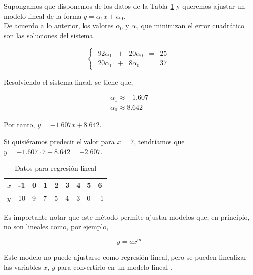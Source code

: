 \begin{ejemplo}
	Supongamos que disponemos de los datos de la Tabla~\ref{tbl:regresion_lineal} y queremos ajustar un modelo lineal de la forma $y = \alpha_1 x + \alpha_0$.\\
	
	De acuerdo a lo anterior, los valores $\alpha_0$ y $\alpha_1$ que minimizan el error cuadrático son las soluciones del sistema
	
	\begin{equation*}
	\begin{cases}
	\begin{array}{ccccc}
	92 \alpha_1 & + & 20 \alpha_0 & = & 25 \\
	20 \alpha_1 & + &  8 \alpha_0 & = & 37
	\end{array}
	\end{cases}
	\end{equation*}
	
	Resolviendo el sistema lineal, se tiene que,
	
	\begin{eqnarray*}
	\alpha_1 \approx -1.607 \\
	\alpha_0 \approx  8.642
	\end{eqnarray*}
	
	Por tanto, $y = -1.607x + 8.642$.
	
	Si quisiéramos predecir el valor para $x=7$, tendríamos que $y = -1.607\cdot 7 + 8.642 = -2.607$.
	
	\begin{table}[htbp!]
		\centering
		\caption{Datos para regresión lineal}
		\label{tbl:regresion_lineal}
		\begin{tabular}{@{}lllllllll@{}}
			\toprule
			$x$ & -1 & 0 & 1 & 2 & 3 & 4 & 5 & 6  \\ \midrule
			$y$ & 10 & 9 & 7 & 5 & 4 & 3 & 0 & -1 \\ \bottomrule
		\end{tabular}
	\end{table}
	
\end{ejemplo}

Es importante notar que este método permite ajustar modelos que, en principio, no son lineales como, por ejemplo, 

\[ y = ax^m \]

Este modelo no puede ajustarse como regresión lineal, pero se pueden linealizar las variables $x$, $y$ para convertirlo en un modelo lineal~\cite[pág 257]{mathews2004numerical}.\\

